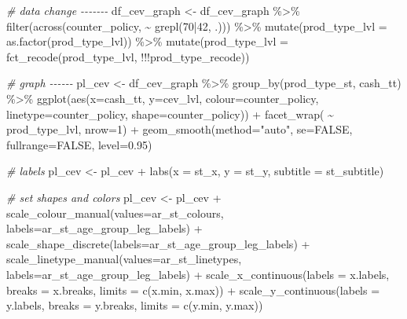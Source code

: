 \documentclass[
]{book}
\newenvironment{Shaded}{\begin{snugshade}}{\end{snugshade}}
\newcommand{\AttributeTok}[1]{\textcolor[rgb]{0.77,0.63,0.00}{#1}}
\newcommand{\CommentTok}[1]{\textcolor[rgb]{0.56,0.35,0.01}{\textit{#1}}}
\newcommand{\ConstantTok}[1]{\textcolor[rgb]{0.00,0.00,0.00}{#1}}
\newcommand{\DecValTok}[1]{\textcolor[rgb]{0.00,0.00,0.81}{#1}}
\newcommand{\FloatTok}[1]{\textcolor[rgb]{0.00,0.00,0.81}{#1}}
\newcommand{\FunctionTok}[1]{\textcolor[rgb]{0.00,0.00,0.00}{#1}}
\newcommand{\NormalTok}[1]{#1}
\newcommand{\OtherTok}[1]{\textcolor[rgb]{0.56,0.35,0.01}{#1}}
\newcommand{\SpecialCharTok}[1]{\textcolor[rgb]{0.00,0.00,0.00}{#1}}
\newcommand{\StringTok}[1]{\textcolor[rgb]{0.31,0.60,0.02}{#1}}
\begin{document}
\begin{Shaded}
\begin{Highlighting}[]
\CommentTok{\# data change {-}{-}{-}{-}{-}{-}{-}}
\NormalTok{df\_cev\_graph }\OtherTok{\textless{}{-}}\NormalTok{ df\_cev\_graph }\SpecialCharTok{\%\textgreater{}\%}
  \FunctionTok{filter}\NormalTok{(}\FunctionTok{across}\NormalTok{(counter\_policy, }\SpecialCharTok{\textasciitilde{}} \FunctionTok{grepl}\NormalTok{(}\StringTok{\textquotesingle{}70|42\textquotesingle{}}\NormalTok{, .))) }\SpecialCharTok{\%\textgreater{}\%}
  \FunctionTok{mutate}\NormalTok{(}\AttributeTok{prod\_type\_lvl =} \FunctionTok{as.factor}\NormalTok{(prod\_type\_lvl)) }\SpecialCharTok{\%\textgreater{}\%}
  \FunctionTok{mutate}\NormalTok{(}\AttributeTok{prod\_type\_lvl =} \FunctionTok{fct\_recode}\NormalTok{(prod\_type\_lvl, }\SpecialCharTok{!!!}\NormalTok{prod\_type\_recode))}

\CommentTok{\# graph {-}{-}{-}{-}{-}{-}}
\NormalTok{pl\_cev }\OtherTok{\textless{}{-}}\NormalTok{ df\_cev\_graph }\SpecialCharTok{\%\textgreater{}\%}
  \FunctionTok{group\_by}\NormalTok{(prod\_type\_st, cash\_tt) }\SpecialCharTok{\%\textgreater{}\%}
  \FunctionTok{ggplot}\NormalTok{(}\FunctionTok{aes}\NormalTok{(}\AttributeTok{x=}\NormalTok{cash\_tt, }\AttributeTok{y=}\NormalTok{cev\_lvl,}
             \AttributeTok{colour=}\NormalTok{counter\_policy, }\AttributeTok{linetype=}\NormalTok{counter\_policy, }\AttributeTok{shape=}\NormalTok{counter\_policy)) }\SpecialCharTok{+}
  \FunctionTok{facet\_wrap}\NormalTok{( }\SpecialCharTok{\textasciitilde{}}\NormalTok{ prod\_type\_lvl, }\AttributeTok{nrow=}\DecValTok{1}\NormalTok{) }\SpecialCharTok{+}
  \FunctionTok{geom\_smooth}\NormalTok{(}\AttributeTok{method=}\StringTok{"auto"}\NormalTok{, }\AttributeTok{se=}\ConstantTok{FALSE}\NormalTok{, }\AttributeTok{fullrange=}\ConstantTok{FALSE}\NormalTok{, }\AttributeTok{level=}\FloatTok{0.95}\NormalTok{)}

\CommentTok{\# labels}
\NormalTok{pl\_cev }\OtherTok{\textless{}{-}}\NormalTok{ pl\_cev }\SpecialCharTok{+}
  \FunctionTok{labs}\NormalTok{(}\AttributeTok{x =}\NormalTok{ st\_x,}
       \AttributeTok{y =}\NormalTok{ st\_y,}
       \AttributeTok{subtitle =}\NormalTok{ st\_subtitle)}

\CommentTok{\# set shapes and colors}
\NormalTok{pl\_cev }\OtherTok{\textless{}{-}}\NormalTok{ pl\_cev }\SpecialCharTok{+}
  \FunctionTok{scale\_colour\_manual}\NormalTok{(}\AttributeTok{values=}\NormalTok{ar\_st\_colours, }\AttributeTok{labels=}\NormalTok{ar\_st\_age\_group\_leg\_labels) }\SpecialCharTok{+}
  \FunctionTok{scale\_shape\_discrete}\NormalTok{(}\AttributeTok{labels=}\NormalTok{ar\_st\_age\_group\_leg\_labels) }\SpecialCharTok{+}
  \FunctionTok{scale\_linetype\_manual}\NormalTok{(}\AttributeTok{values=}\NormalTok{ar\_st\_linetypes, }\AttributeTok{labels=}\NormalTok{ar\_st\_age\_group\_leg\_labels) }\SpecialCharTok{+}
  \FunctionTok{scale\_x\_continuous}\NormalTok{(}\AttributeTok{labels =}\NormalTok{ x.labels, }\AttributeTok{breaks =}\NormalTok{ x.breaks,}
                     \AttributeTok{limits =} \FunctionTok{c}\NormalTok{(x.min, x.max)) }\SpecialCharTok{+}
  \FunctionTok{scale\_y\_continuous}\NormalTok{(}\AttributeTok{labels =}\NormalTok{ y.labels, }\AttributeTok{breaks =}\NormalTok{ y.breaks,}
                     \AttributeTok{limits =} \FunctionTok{c}\NormalTok{(y.min, y.max))}


\end{Highlighting}
\end{Shaded}
\end{document}
